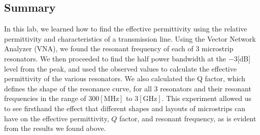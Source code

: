 \documentclass[
	letterpaper, %
	10pt, %
]{CSUniSchoolLabReport}
\begin{document}
\subsection{Summary}

In this lab, we learned how to find the effective permittivity using the relative permittivity and characteristics of a transmission line. Using the Vector Network Analyzer (VNA), we found the resonant frequency of each of 3 microstrip resonators. We then proceeded to find the half power bandwidth at the $-3$[dB] level from the peak, and used the observed values to calculate the effective permittivity of the various resonators. We also calculated the Q factor, which defines the shape of the resonance curve, for all 3 resonators and their resonant frequencies in the range of $300[\si{\mega\hertz}]$ to $3[\si{\giga\hertz}]$. This experiment allowed us to see firsthand the effect that different shapes and layouts of microstrips can have on the effective permittivity, $Q$ factor, and resonant frequency, as is evident from the results we found above.
\end{document}
